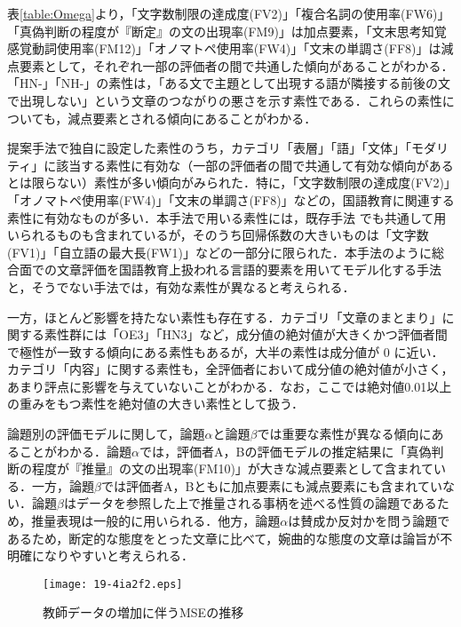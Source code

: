 \documentclass[japanese]{jnlp_1.5}
\newenvironment{iindent1zw}{}{}
\begin{document}
\begin{iindent1zw}
表\ref{table:Omega}より，「文字数制限の達成度(FV2)」「複合名詞の使用率(FW6)」「真偽判断の程度が『断定』の文の出現率(FM9)」は加点要素，「文末思考知覚感覚動詞使用率(FM12)」「オノマトペ使用率(FW4)」「文末の単調さ(FF8)」は減点要素として，それぞれ一部の評価者の間で共通した傾向があることがわかる．「HN-」「NH-」の素性は，「ある文で主題として出現する語が隣接する前後の文で出現しない」という文章のつながりの悪さを示す素性である．これらの素性についても，減点要素とされる傾向にあることがわかる．

提案手法で独自に設定した素性のうち，カテゴリ「表層」「語」「文体」「モダリティ」に該当する素性に有効な（一部の評価者の間で共通して有効な傾向があるとは限らない）素性が多い傾向がみられた．特に，「文字数制限の達成度(FV2)」「オノマトペ使用率(FW4)」「文末の単調さ(FF8)」などの，国語教育に関連する素性に有効なものが多い．本手法で用いる素性には，既存手法
\cite{AttaliBurstein2006}
\cite{IshiokaKameda2006}
でも共通して用いられるものも含まれているが，そのうち回帰係数の大きいものは「文字数(FV1)」「自立語の最大長(FW1)」などの一部分に限られた．本手法のように総合面での文章評価を国語教育上扱われる言語的要素を用いてモデル化する手法と，そうでない手法では，有効な素性が異なると考えられる．

一方，ほとんど影響を持たない素性も存在する．カテゴリ「文章のまとまり」に関する素性群には「OE3」「HN3」など，成分値の絶対値が大きくかつ評価者間で極性が一致する傾向にある素性もあるが，大半の素性は成分値が 0 に近い．カテゴリ「内容」に関する素性も，全評価者において成分値の絶対値が小さく，あまり評点に影響を与えていないことがわかる．なお，ここでは絶対値0.01以上の重みをもつ素性を絶対値の大きい素性として扱う．

論題別の評価モデルに関して，論題$\alpha$と論題$\beta$では重要な素性が異なる傾向にあることがわかる．論題$\alpha$では，評価者A，Bの評価モデルの推定結果に「真偽判断の程度が『推量』の文の出現率(FM10)」が大きな減点要素として含まれている．一方，論題$\beta$では評価者A，Bともに加点要素にも減点要素にも含まれていない．論題$\beta$はデータを参照した上で推量される事柄を述べる性質の論題であるため，推量表現は一般的に用いられる．他方，論題$\alpha$は賛成か反対かを問う論題であるため，断定的な態度をとった文章に比べて，婉曲的な態度の文章は論旨が不明確になりやすいと考えられる．

\begin{figure}[b]
	\begin{center}
	\texttt{[image: 19-4ia2f2.eps]}
	\end{center}
	\caption{教師データの増加に伴うMSEの推移\protect\footnotemark}
	\label{fig:B}
\vspace{-1\Cvs}
\end{figure}


\end{iindent1zw}
\end{document}
